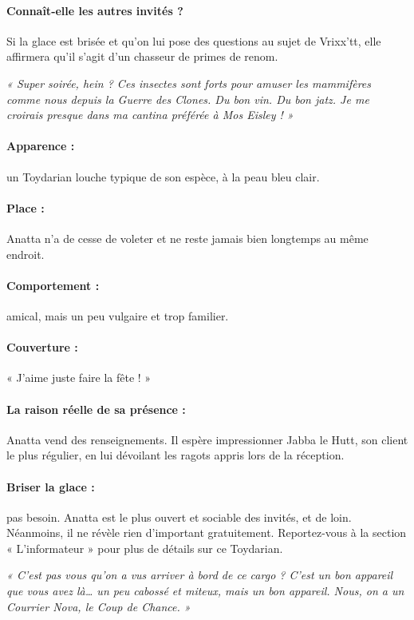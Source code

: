 \documentclass[a4paper,10pt,twoside,twocolumn,openany]{book}
\begin{document}
\paragraph{Connaît-elle les autres invités ?} Si la glace est brisée
et qu’on lui pose des questions au sujet de Vrixx’tt, elle
affirmera qu’il s’agit d’un chasseur de primes de renom.

\subtitle{ANATTA}
\emph{« Super soirée, hein ? Ces insectes sont forts pour
amuser les mammifères comme nous depuis la Guerre
des Clones. Du bon vin. Du bon jatz. Je me croirais
presque dans ma cantina préférée à Mos Eisley ! »}

\paragraph{Apparence :} un Toydarian louche typique de son espèce, à la peau bleu clair.

\paragraph{Place :} Anatta n’a de cesse de voleter et ne reste jamais
bien longtemps au même endroit.

\paragraph{Comportement :} amical, mais un peu vulgaire et trop
familier.

\paragraph{Couverture :} « J’aime juste faire la fête ! »
\paragraph{La raison réelle de sa présence :} Anatta vend des renseignements. Il espère impressionner Jabba le Hutt, son
client le plus régulier, en lui dévoilant les ragots appris
lors de la réception.
\paragraph{Briser la glace :} pas besoin. Anatta est le plus ouvert
et sociable des invités, et de loin. Néanmoins, il ne révèle rien d’important gratuitement. Reportez-vous à
la section « L’informateur » pour plus de détails sur ce
Toydarian.

\subtitle{ORPA ET WEX VIO}
\emph{« C’est pas vous qu’on a vus arriver à bord de ce
cargo ? C’est un bon appareil que vous avez là… un
peu cabossé et miteux, mais un bon appareil. Nous, on
a un Courrier Nova, le Coup de Chance. »}
\end{document}
